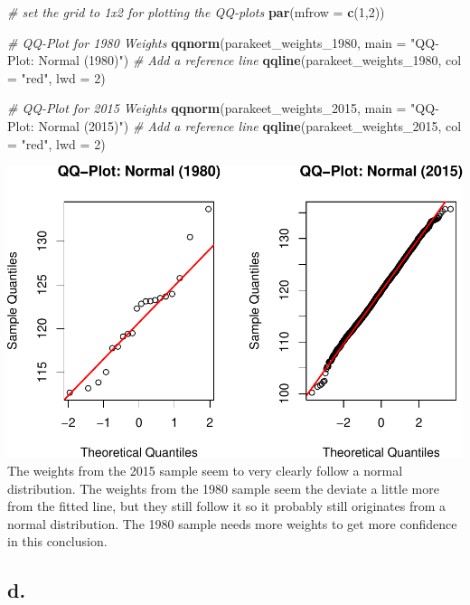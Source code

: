\documentclass[
]{article}
\newenvironment{Shaded}{\begin{snugshade}}{\end{snugshade}}
\newcommand{\AttributeTok}[1]{\textcolor[rgb]{0.13,0.29,0.53}{#1}}
\newcommand{\CommentTok}[1]{\textcolor[rgb]{0.56,0.35,0.01}{\textit{#1}}}
\newcommand{\DecValTok}[1]{\textcolor[rgb]{0.00,0.00,0.81}{#1}}
\newcommand{\FunctionTok}[1]{\textcolor[rgb]{0.13,0.29,0.53}{\textbf{#1}}}
\newcommand{\NormalTok}[1]{#1}
\newcommand{\StringTok}[1]{\textcolor[rgb]{0.31,0.60,0.02}{#1}}
\begin{document}
\begin{Shaded}
\begin{Highlighting}[]
\CommentTok{\# set the grid to 1x2 for plotting the QQ{-}plots}
\FunctionTok{par}\NormalTok{(}\AttributeTok{mfrow =} \FunctionTok{c}\NormalTok{(}\DecValTok{1}\NormalTok{,}\DecValTok{2}\NormalTok{))}

\CommentTok{\# QQ{-}Plot for 1980 Weights}
\FunctionTok{qqnorm}\NormalTok{(parakeet\_weights\_1980, }\AttributeTok{main =} \StringTok{"QQ{-}Plot: Normal (1980)"}\NormalTok{)}
\CommentTok{\# Add a reference line}
\FunctionTok{qqline}\NormalTok{(parakeet\_weights\_1980, }\AttributeTok{col =} \StringTok{"red"}\NormalTok{, }\AttributeTok{lwd =} \DecValTok{2}\NormalTok{)}

\CommentTok{\# QQ{-}Plot for 2015 Weights}
\FunctionTok{qqnorm}\NormalTok{(parakeet\_weights\_2015, }\AttributeTok{main =} \StringTok{"QQ{-}Plot: Normal (2015)"}\NormalTok{)}
\CommentTok{\# Add a reference line}
\FunctionTok{qqline}\NormalTok{(parakeet\_weights\_2015, }\AttributeTok{col =} \StringTok{"red"}\NormalTok{, }\AttributeTok{lwd =} \DecValTok{2}\NormalTok{)}
\end{Highlighting}
\end{Shaded}

\includegraphics{SDA_A2_files/figure-latex/unnamed-chunk-5-1.pdf} The
weights from the 2015 sample seem to very clearly follow a normal
distribution. The weights from the 1980 sample seem the deviate a little
more from the fitted line, but they still follow it so it probably still
originates from a normal distribution. The 1980 sample needs more
weights to get more confidence in this conclusion.

\subsection{d.}\label{d.}
\end{document}
